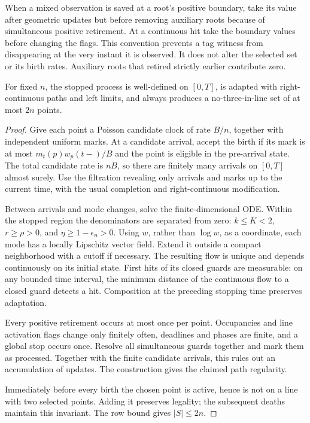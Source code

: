 When a mixed observation is saved at a root's positive boundary, take
its value after geometric updates but before removing auxiliary roots
because of simultaneous positive retirement. At a continuous hit take
the boundary values before changing the flags. This convention prevents
a tag witness from disappearing at the very instant it is observed.
It does not alter the selected set or its birth rates. Auxiliary roots
that retired strictly earlier contribute zero.

\begin{proposition}\label{prop:construction}
For fixed \(n\), the stopped process is well-defined on \([0,T]\),
is adapted with right-continuous paths and left limits, and always
produces a no-three-in-line set of at most \(2n\) points.
\end{proposition}
\begin{proof}
Give each point a Poisson candidate clock of rate \(B/n\), together
with independent uniform marks. At a candidate arrival, accept the
birth if its mark is at most \(m_t(p)w_p(t-)/B\) and the point is
eligible in the pre-arrival state. The total candidate rate is \(nB\),
so there are finitely many arrivals on \([0,T]\) almost surely.
Use the filtration revealing only arrivals and marks up to the current
time, with the usual completion and right-continuous modification.

Between arrivals and mode changes, solve the finite-dimensional ODE.
Within the stopped region the denominators are separated from zero:
\(k\le K<2\), \(r\ge\rho>0\), and \(\eta\ge1-\epsilon_n>0\).
Using \(w\), rather than \(\log w\), as a coordinate, each mode has a
locally Lipschitz vector field. Extend it outside a compact
neighborhood with a cutoff if necessary. The resulting flow is unique
and depends continuously on its initial state. First hits of its
closed guards are measurable: on any bounded time interval, the
minimum distance of the continuous flow to a closed guard detects a
hit. Composition at the preceding stopping time preserves adaptation.

Every positive retirement occurs at most once per point. Occupancies
and line activation flags change only finitely often, deadlines and
phases are finite, and a global stop occurs once. Resolve all
simultaneous guards together and mark them as processed. Together with
the finite candidate arrivals, this rules out an accumulation of
updates. The construction gives the claimed path regularity.

Immediately before every birth the chosen point is active, hence is
not on a line with two selected points. Adding it preserves legality;
the subsequent deaths maintain this invariant. The row bound gives
\(|S|\le2n\).
\end{proof}

